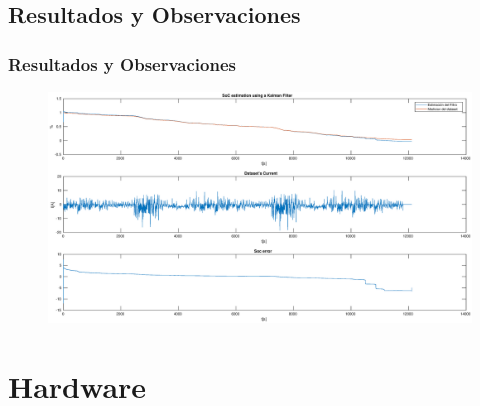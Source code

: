 \documentclass[10pt]{beamer}
\theoremstyle{remark}
\theoremstyle{definition}
\begin{document}
\subsection{Resultados y Observaciones}
\begin{frame}[allowframebreaks]
  \frametitle{Resultados y Observaciones}
  \begin{figure}[h!]
	\includegraphics[width=1\textwidth]{images/kf_result_25degree.eps}
  \end{figure}
\end{frame}

\section{Hardware}
\end{document}
